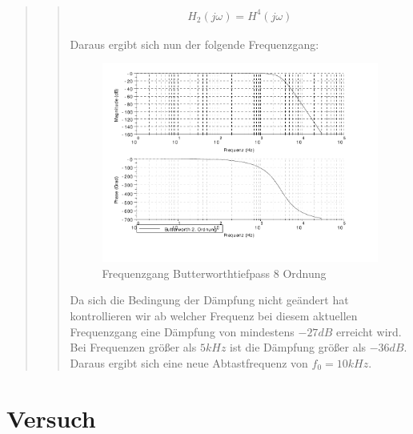 \begin{quote}
\begin{quote}
        \begin{equation*}
        	\begin{split}
        		H_2(j\omega) = H^4 (j\omega)
        	\end{split}
        \end{equation*}
        
        Daraus ergibt sich nun der folgende Frequenzgang:
        
        \begin{figure}[H]
			\centering
				\includegraphics[scale=0.5]{Frequenzgang8Ordnung}
				   \caption{Frequenzgang Butterworthtiefpass 8 Ordnung}
		\end{figure}
		\vspace{1em}
	 	
	 	Da sich die Bedingung der Dämpfung nicht geändert hat kontrollieren wir ab welcher Frequenz bei diesem aktuellen
	 	Frequenzgang eine Dämpfung von mindestens $-27 dB$ erreicht wird.\\
	 	Bei Frequenzen größer als $5kHz$ ist die Dämpfung größer als $-36 dB$. Daraus ergibt sich eine neue Abtastfrequenz
	 	von $f_0 = 10kHz$.
    \end{quote}
\end{quote}


\section{Versuch}
\begin{quote}
	
\end{quote}

